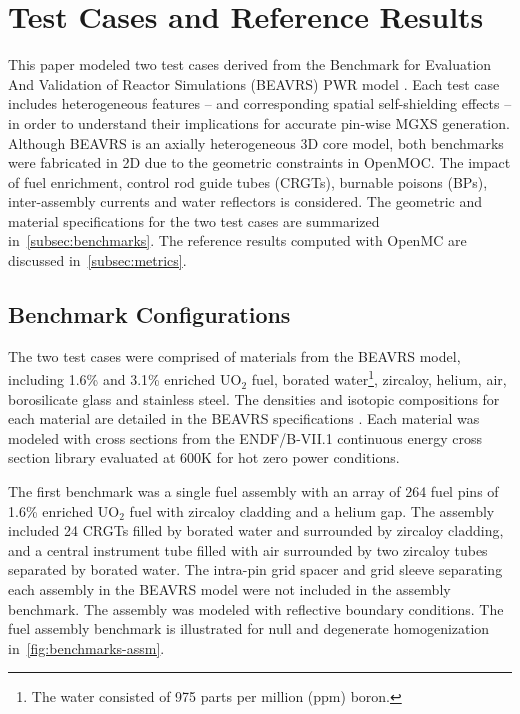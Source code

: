 \section{Test Cases and Reference Results}
\label{sec:test-cases}

This paper modeled two test cases derived from the Benchmark for Evaluation And Validation of Reactor Simulations (BEAVRS) PWR model \citep{horelik2013beavrs}. Each test case includes heterogeneous features -- and corresponding spatial self-shielding effects -- in order to understand their implications for accurate pin-wise MGXS generation. Although BEAVRS is an axially heterogeneous 3D core model, both benchmarks were fabricated in 2D due to the geometric constraints in OpenMOC. The impact of fuel enrichment, control rod guide tubes (CRGTs), burnable poisons (BPs), inter-assembly currents and water reflectors is considered. The geometric and material specifications for the two test cases are summarized in~\autoref{subsec:benchmarks}. The reference results computed with OpenMC are discussed in~\autoref{subsec:metrics}.


\subsection{Benchmark Configurations}
\label{subsec:benchmarks}

The two test cases were comprised of materials from the BEAVRS model, including 1.6\% and 3.1\% enriched UO$_2$ fuel, borated water\footnote{The water consisted of 975 parts per million (ppm) boron.}, zircaloy, helium, air, borosilicate glass and stainless steel. The densities and isotopic compositions for each material are detailed in the BEAVRS specifications \citep{horelik2013beavrs}. Each material was modeled with cross sections from the ENDF/B-VII.1 continuous energy cross section library \citep{mcnpx2003manual} evaluated at 600K for hot zero power conditions.

The first benchmark was a single fuel assembly with an array of 264 fuel pins of 1.6\% enriched UO$_2$ fuel with zircaloy cladding and a helium gap. The assembly included 24 CRGTs filled by borated water and surrounded by zircaloy cladding, and a central instrument tube filled with air surrounded by two zircaloy tubes separated by borated water. The intra-pin grid spacer and grid sleeve separating each assembly in the BEAVRS model were not included in the assembly benchmark. The assembly was modeled with reflective boundary conditions. The fuel assembly benchmark is illustrated for null and degenerate homogenization in~\autoref{fig:benchmarks-assm}.

